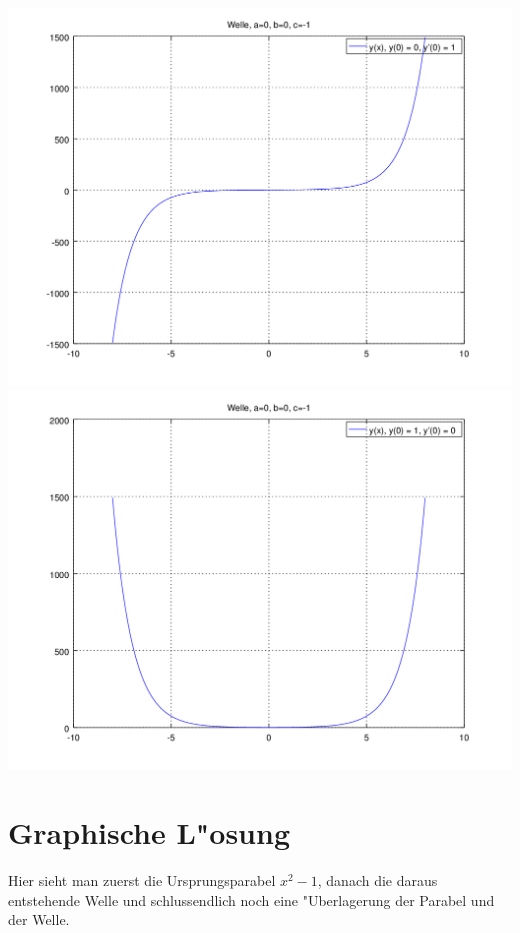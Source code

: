 \begin{refsection}
\noindent
\includegraphics[scale=0.35]{./wellen/octave/images/grundfunktionen/sinh.png}
\includegraphics[scale=0.35]{./wellen/octave/images/grundfunktionen/cosh.png}


\section{Graphische L"osung}

Hier sieht man zuerst die Ursprungsparabel $x^2-1$, danach die daraus 
entstehende Welle und schlussendlich noch eine "Uberlagerung der Parabel und 
der Welle.


\end{refsection}
